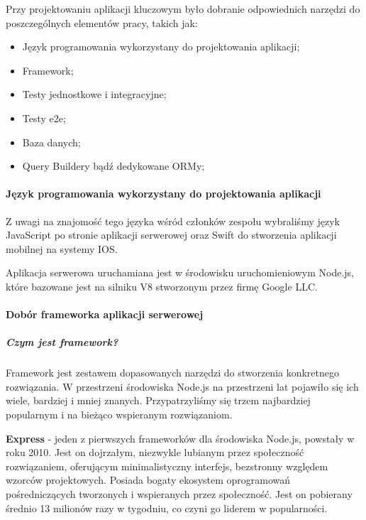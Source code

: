 \documentclass[12pt, a4paper, twoside, openany]{book}
\begin{document}
Przy projektowaniu aplikacji kluczowym było dobranie odpowiednich narzędzi do
poszczególnych elementów pracy, takich jak:
\begin{itemize}
    \item Język programowania wykorzystany do projektowania aplikacji;
    \item Framework;
    \item Testy jednostkowe i integracyjne; %
    \item Testy e2e; %
    \item Baza danych; %
    \item Query Buildery bądź dedykowane ORMy; %
\end{itemize}

\paragraph{Język programowania wykorzystany do projektowania aplikacji\\}

Z uwagi na znajomość tego języka wśród członków zespołu wybraliśmy język JavaScript
po stronie aplikacji serwerowej oraz Swift do stworzenia aplikacji mobilnej na
systemy IOS.

Aplikacja serwerowa uruchamiana jest w środowisku uruchomieniowym Node.js, które bazowane jest na
silniku V8 stworzonym przez firmę Google LLC.

\paragraph{Dobór frameworka aplikacji serwerowej}
\subparagraph{Czym jest framework?\\}

Framework jest zestawem dopasowanych narzędzi do stworzenia konkretnego rozwiązania.
W przestrzeni środowiska Node.js na przestrzeni lat pojawiło się ich wiele, bardziej i
mniej znanych. Przypatrzyliśmy się trzem najbardziej popularnym i na bieżąco wspieranym
rozwiązaniom.

\textbf{Express} - jeden z pierwszych frameworków dla środowiska Node.js, powstały w roku 2010.
Jest on dojrzałym, niezwykle lubianym przez społeczność rozwiązaniem, oferującym
minimalistyczny interfejs, bezstronny względem wzorców projektowych. Posiada bogaty ekosystem
oprogramowań pośredniczących tworzonych i wspieranych przez społeczność.
Jest on pobierany średnio 13 milionów razy w tygodniu, co czyni go liderem w popularności.
\end{document}

